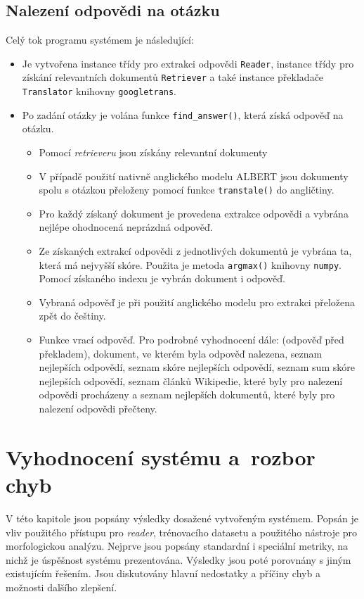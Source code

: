 \section*{Nalezení odpovědi na otázku}
Celý tok programu systémem je následující:
\begin{itemize}
    \item Je vytvořena instance třídy pro extrakci odpovědi \texttt{Reader}, instance třídy pro získání relevantních dokumentů \texttt{Retriever} a také instance překladače \texttt{Translator} knihovny \texttt{googletrans}.
    
    \item Po zadání otázky je volána funkce \texttt{find\_answer()}, která získá odpověď na otázku.
    \begin{itemize}
        \item Pomocí \emph{retrieveru} jsou získány relevantní dokumenty
        \item V případě použití nativně anglického modelu ALBERT jsou dokumenty spolu s otázkou přeloženy pomocí funkce \texttt{transtale()} do angličtiny.
        \item Pro každý získaný dokument je provedena extrakce odpovědi a vybrána nejlépe ohodnocená neprázdná odpověď.
        \item Ze získaných extrakcí odpovědi z jednotlivých dokumentů je vybrána ta, která má nejvyšší skóre. Použita je metoda \texttt{argmax()} knihovny \texttt{numpy}. Pomocí získaného indexu je vybrán dokument i odpověď.
        \item Vybraná odpověď je při použití anglického modelu pro extrakci přeložena zpět do češtiny.
        \item Funkce vrací odpověď. Pro podrobné vyhodnocení dále: (odpověď před překladem), dokument, ve kterém byla odpověď nalezena, seznam nejlepších odpovědí, seznam skóre nejlepších odpovědí, seznam sum skóre nejlepších odpovědí, seznam článků Wikipedie, které byly pro nalezení odpovědi procházeny a seznam nejlepších dokumentů, které byly pro nalezení odpovědi přečteny.
    \end{itemize}
\end{itemize}



\chapter{Vyhodnocení systému a~rozbor chyb}
\label{system_evaluation}
V této kapitole jsou popsány výsledky dosažené vytvořeným systémem. Popsán je vliv použitého přístupu pro \emph{reader}, trénovacího datasetu a použitého nástroje pro morfologickou analýzu. Nejprve jsou popsány standardní i speciální metriky, na nichž je úspěšnost systému prezentována. Výsledky jsou poté porovnány s jiným existujícím řešením. Jsou diskutovány hlavní nedostatky a příčiny chyb a možnosti dalšího zlepšení.


